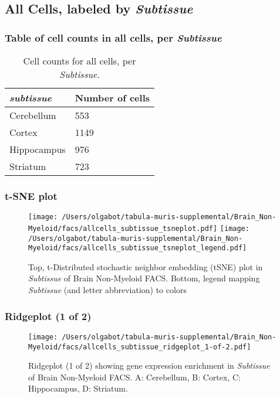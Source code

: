 \clearpage
\subsection{All Cells, labeled by \emph{Subtissue}}
\subsubsection{Table of cell counts in all cells, per \emph{Subtissue}}\begin{table}[h]
\centering
\label{my-label}
\begin{tabular}{@{}ll@{}}
\toprule

\emph{subtissue}& Number of cells \\ \midrule
Cerebellum & 553 \\

Cortex & 1149 \\

Hippocampus & 976 \\

Striatum & 723 \\
\bottomrule
\end{tabular}
\caption{Cell counts for all cells, per \emph{Subtissue}.}
\end{table}

\clearpage
\subsubsection{t-SNE plot}
\begin{figure}[h]
\centering
\texttt{[image: /Users/olgabot/tabula-muris-supplemental/Brain\_Non-Myeloid/facs/allcells\_subtissue\_tsneplot.pdf]}
\texttt{[image: /Users/olgabot/tabula-muris-supplemental/Brain\_Non-Myeloid/facs/allcells\_subtissue\_tsneplot\_legend.pdf]}
\caption{Top, t-Distributed stochastic neighbor embedding (tSNE) plot  in \emph{Subtissue} of Brain Non-Myeloid FACS. Bottom, legend mapping \emph{Subtissue} (and letter abbreviation) to colors}
\end{figure}


\clearpage
\subsubsection{Ridgeplot (1 of 2)}
\begin{figure}[h]
\centering
\texttt{[image: /Users/olgabot/tabula-muris-supplemental/Brain\_Non-Myeloid/facs/allcells\_subtissue\_ridgeplot\_1-of-2.pdf]}

\caption{ Ridgeplot (1 of 2)  showing gene expression enrichment in \emph{Subtissue} of Brain Non-Myeloid FACS. A: Cerebellum, B: Cortex, C: Hippocampus, D: Striatum.}
\end{figure}


